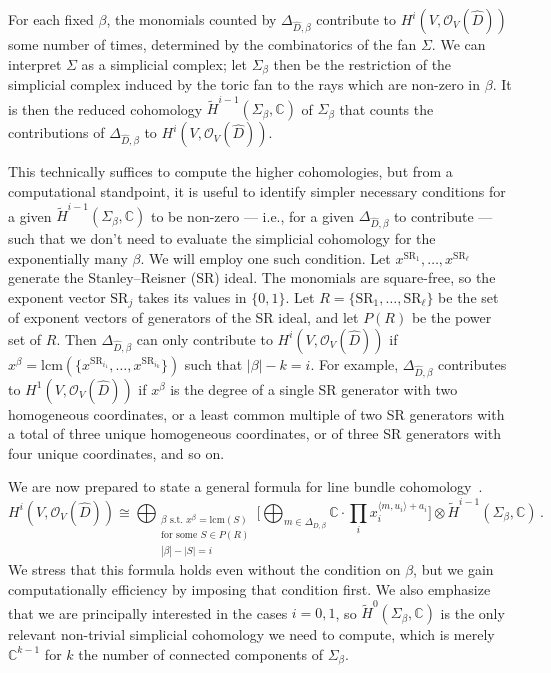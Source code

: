 \documentclass[11pt,dvipsnames]{article}
\theoremstyle{definition}
\begin{document}
For each fixed $\beta$, the monomials counted by $\Delta_{\hat{D},\beta}$ contribute to $H^i(V, \mathcal{O}_V(\hat{D}))$ some number of times, determined by the combinatorics of the fan $\Sigma$. We can interpret $\Sigma$ as a simplicial complex; let $\Sigma_\beta$ then be the restriction of the simplicial complex induced by the toric fan to the rays which are non-zero in $\beta$. It is then the reduced cohomology $\tilde{H}^{i-1}(\Sigma_\beta,\mathbb{C})$ of $\Sigma_\beta$ that counts the contributions of $\Delta_{\hat{D},\beta}$ to $H^i(V, \mathcal{O}_V(\hat{D}))$. 

This technically suffices to compute the higher cohomologies, but from a computational standpoint, it is useful to identify simpler necessary conditions for a given $\tilde{H}^{i-1}(\Sigma_\beta,\mathbb{C})$ to be non-zero --- i.e., for a given $\Delta_{\hat{D},\beta}$ to contribute --- such that we don't need to evaluate the simplicial cohomology for the exponentially many $\beta$. We will employ one such condition. Let $x^{\mathrm{SR}_1}, \dots, x^{\mathrm{SR}_\ell}$ generate the Stanley--Reisner (SR) ideal. The monomials are square-free, so the exponent vector $\mathrm{SR}_j$ takes its values in $\{0,1\}$. Let $R = \{\mathrm{SR}_1, \dots, \mathrm{SR}_\ell\}$ be the set of exponent vectors of generators of the SR ideal, and let $P(R)$ be the power set of $R$. Then $\Delta_{\hat{D},\beta}$ can only contribute to $H^i(V, \mathcal{O}_V(\hat{D}))$ if $x^\beta = \mathrm{lcm}(\{x^{\mathrm{SR}_{i_1}}, \dots, x^{\mathrm{SR}_{i_k}}\})$ such that $|\beta| - k = i$. For example, $\Delta_{\hat{D},\beta}$ contributes to $H^1(V, \mathcal{O}_V(\hat{D}))$ if $x^\beta$ is the degree of a single SR generator with two homogeneous coordinates, or a least common multiple of two SR generators with a total of three unique homogeneous coordinates, or of three SR generators with four unique coordinates, and so on.

We are now prepared to state a general formula for line bundle cohomology~\cite{eisenbud_coho,maclagan_multigraded_2004,Blumenhagen:2010pv}.
\begin{equation}
    H^i(V, \mathcal{O}_V(\hat{D})) \cong \bigoplus_{\substack{\beta \text{ s.t. } x^\beta = \mathrm{lcm}(S) \\ \text{for some }S \in P(R)\\ |\beta| - |S| = i}} \bigg[\bigoplus_{m \in \Delta_{D,\beta}} \mathbb{C} \cdot \prod_i x_i^{\langle m, u_i \rangle + a_i}\bigg]\otimes \tilde{H}^{i-1}(\Sigma_\beta,\mathbb{C})\,.
\end{equation}
We stress that this formula holds even without the condition on $\beta$, but we gain computationally efficiency by imposing that condition first. We also emphasize that we are principally interested in the cases $i = 0, 1$, so $\tilde{H}^{0}(\Sigma_\beta,\mathbb{C})$ is the only relevant non-trivial simplicial cohomology we need to compute, which is merely $\mathbb{C}^{k-1}$ for $k$ the number of connected components of $\Sigma_\beta$. 
\end{document}
